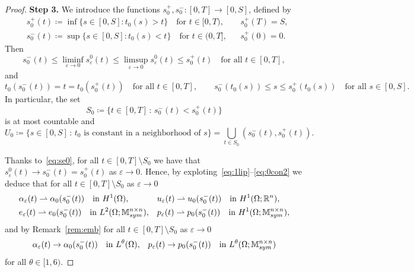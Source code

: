 \documentclass[reqno]{amsart}
\theoremstyle{definition}
\numberwithin{equation}{section}
\def\R {\mathbb R}
\def\M {\mathbb M^{n\times n}_{\rm sym}}
\begin{document}
\begin{proof}
{\bf Step 3.} We introduce the functions $s_0^+,s_0^-\colon [0,T]\to [0,S]$, defined by
\begin{align*}
&s_0^+(t)\coloneqq \inf\{s\in[0,S]:t_0(s)>t\}\quad\text{for $t\in[0,T)$},& &s_0^+(T)=S,\\
&s_0^-(t)\coloneqq \sup\{s\in[0,S]:t_0(s)<t\}\quad\text{for $t\in(0,T]$},& &s_0^+(0)=0.
\end{align*}
Then
\begin{equation}\label{eq:se0}
s_0^-(t)\le \liminf_{\varepsilon\to 0}s_\varepsilon^0(t)\le \limsup_{\varepsilon\to 0}s_\varepsilon^0(t)\le s_0^+(t)\quad\text{for all $t\in[0,T]$},
\end{equation}
and
$$t_0(s_0^-(t))=t=t_0(s_0^+(t))\quad\text{for all $t\in[0,T]$},\qquad s_0^-(t_0(s))\le s\le s_0^+(t_0(s))\quad\text{for all $s\in[0,S]$}.$$
In particular, the set
$$S_0\coloneqq \{t\in[0,T]\,:\,s_0^-(t)<s_0^+(t)\}$$
is at most countable and
$$U_0\coloneqq \{s\in[0,S]\,:\,\text{$t_0$ is constant in a neighborhood of $s$}\}=\bigcup_{t\in S_0}(s_0^-(t),s_0^+(t)).$$

Thanks to~\eqref{eq:se0}, for all $t\in[0,T]\setminus S_0$ we have that $s_\varepsilon^0(t)\to s_0^-(t)=s_0^+(t)$ as $\varepsilon\to 0$. Hence, by exploting~\eqref{eq:1lip}--\eqref{eq:0con2} we deduce that for all $t\in[0,T]\setminus S_0$ as $\varepsilon \to 0$ 
\begin{align}
& \alpha_\varepsilon(t)\rightharpoonup \alpha_0(s_0^-(t))\quad\text{in $H^1(\Omega)$}, & & u_\varepsilon(t)\rightharpoonup u_0(s_0^-(t))\quad\text{in $H^1(\Omega;\R^n)$},\label{eq:weakcon1}\\
& e_\varepsilon(t)\rightharpoonup e_0(s_0^-(t))\quad\text{in $L^2(\Omega;\M)$}, & & p_\varepsilon(t)\rightharpoonup p_0(s_0^-(t))\quad\text{in $H^1(\Omega;\M)$},\label{eq:weakcon2}
\end{align}
and by Remark~\ref{rem:emb} for all $t\in[0,T]\setminus S_0$ as $\varepsilon \to 0$ 
\begin{align*}
\alpha_\varepsilon(t)\to \alpha_0(s_0^-(t))\quad\text{in $L^\theta(\Omega)$}, & & p_\varepsilon(t)\to p_0(s_0^-(t))\quad\text{in $L^\theta(\Omega;\M)$}
\end{align*}
for all $\theta\in[1,6)$.


\end{proof}
\end{document}

